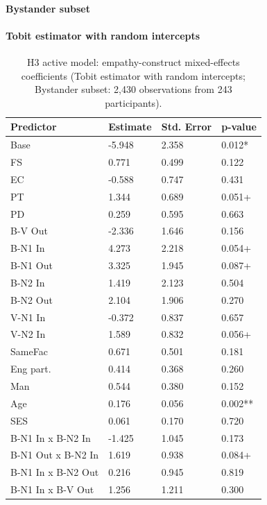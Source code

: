 \documentclass[11pt]{article}
\begin{document}
\paragraph{Bystander subset}

\paragraph{Tobit estimator with random intercepts}

\begin{table}[H]
\centering
{\fontsize{11}{13}\selectfont
\renewcommand{\arraystretch}{1.10}
\caption{H3 active model: empathy-construct mixed-effects coefficients (Tobit estimator with random intercepts; Bystander subset: 2,430 observations from 243 participants).}
\label{tab:h3_b_bystander}
\begin{tabularx}{\textwidth}{>{\raggedright\arraybackslash}Xlll}
\toprule
Predictor & Estimate & Std. Error & p-value \\
\midrule
Base & -5.948 & 2.358 & 0.012* \\
FS & 0.771 & 0.499 & 0.122 \\
EC & -0.588 & 0.747 & 0.431 \\
PT & 1.344 & 0.689 & 0.051+ \\
PD & 0.259 & 0.595 & 0.663 \\
B-V Out & -2.336 & 1.646 & 0.156 \\
B-N1 In & 4.273 & 2.218 & 0.054+ \\
B-N1 Out & 3.325 & 1.945 & 0.087+ \\
B-N2 In & 1.419 & 2.123 & 0.504 \\
B-N2 Out & 2.104 & 1.906 & 0.270 \\
V-N1 In & -0.372 & 0.837 & 0.657 \\
V-N2 In & 1.589 & 0.832 & 0.056+ \\
SameFac & 0.671 & 0.501 & 0.181 \\
Eng part. & 0.414 & 0.368 & 0.260 \\
Man & 0.544 & 0.380 & 0.152 \\
Age & 0.176 & 0.056 & 0.002** \\
SES & 0.061 & 0.170 & 0.720 \\
B-N1 In x B-N2 In & -1.425 & 1.045 & 0.173 \\
B-N1 Out x B-N2 In & 1.619 & 0.938 & 0.084+ \\
B-N1 In x B-N2 Out & 0.216 & 0.945 & 0.819 \\
B-N1 In x B-V Out & 1.256 & 1.211 & 0.300 \\

\end{tabularx}}
\end{table}
\end{document}
